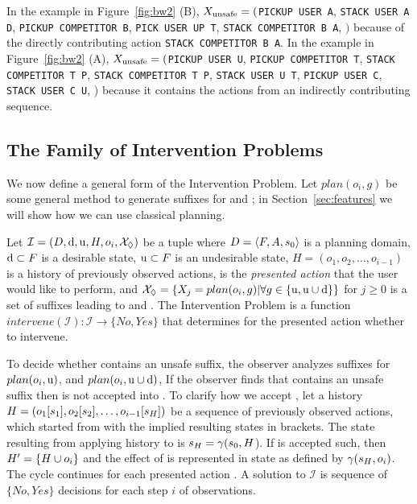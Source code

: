 In the example in Figure~\ref{fig:bw2} (B), $X_{\textnormal{unsafe}}=($\texttt{PICKUP USER A}, \texttt{STACK USER A D}, \texttt{PICKUP COMPETITOR B}, \texttt{PICK USER UP T}, \texttt{STACK COMPETITOR B A}, \undesired$)$ because of the directly contributing action \texttt{STACK COMPETITOR B A}. In the example in Figure~\ref{fig:bw2} (A), $X_{\textnormal{unsafe}}=($\texttt{PICKUP USER U}, \texttt{PICKUP COMPETITOR T}, \texttt{STACK COMPETITOR T P}, \texttt{STACK COMPETITOR T P}, \texttt{STACK USER U T}, \texttt{PICKUP USER C}, \texttt{STACK USER C U}, \dandu) because it contains the actions from an indirectly contributing sequence.

\subsection{The Family of Intervention Problems}
\label{sec:intervention-family}
We now define a general form of the Intervention Problem.
Let $plan(o_i, g)$ be some general method to generate suffixes for \planDesired and \planUndesired; in Section~\ref{sec:features} we will show how we can use classical planning.

\begin{definition}
  \label{def:standard}
  Let $\mathcal{I} = (D, \mathrm{d}, \mathrm{u}, H, o_i, \mathcal{X}_\Diamond)$ be a tuple where
  $D=\langle F, A, s_0 \rangle$ is a planning domain,
  $\mathrm{d} \subset F$ is a desirable state,
  $\mathrm{u} \subset F$ is an undesirable state,
  $H = (o_1, o_2, \ldots, o_{i-1})$ is a history of previously observed actions,
  \presentedAction is the \emph{presented action} that the user would like to perform, and
  $\mathcal{X}_\Diamond = \{ X_j = plan( o_i, g) | \forall g \in \{\mathrm{u}, \mathrm{u}\cup\mathrm{d}\} \}$ for $j \geq 0$ is a set of suffixes leading to \undesired and \dandu.
The \textnormal{Intervention Problem} is a function $intervene (\mathcal{I}) :  \mathcal{I} \rightarrow \{No, Yes\} $
that determines for the presented action \presentedAction whether to intervene.
\end{definition}
\noindent
To decide whether \Suffixes contains an unsafe suffix, the observer analyzes suffixes for 
   $plan(o_i, \mathrm{u})$, and
   $plan(o_i, \mathrm{u}\cup\mathrm{d})$,  
If the observer finds that \Suffixes contains an unsafe suffix then \presentedAction is not accepted into \historyDef.
To clarify how we accept \presentedAction,  let a history  $H = ( o_1 [s_1], o_2 [s_2], \ldots, o_{i-1} [s_{H}])$  be a sequence of previously observed actions, which started from \initialState with the implied resulting states in brackets.
The state resulting from applying history to \initialState is $s_{H} = \gamma(s_0, H$).
If \presentedAction is accepted such, then  $H'=\lbrace H\cup o_i\rbrace$ and the effect of \presentedAction is represented in state as defined by $\gamma(s_{H}, o_i)$.
The cycle continues for each presented action \presentedAction.
A solution to $\mathcal{I}$  is sequence of $\{No, Yes \}$ decisions for each step $i$ of observations.

